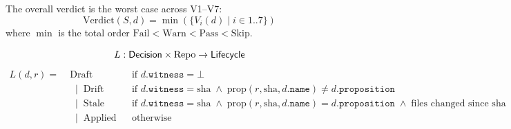 \begin{definition}
The overall verdict is the worst case across V1--V7:
$$\mathrm{Verdict}(S, d) = \min(\{V_i(d) \mid i \in 1..7\})$$
where $\min$ is the total order $\mathrm{Fail} < \mathrm{Warn} < \mathrm{Pass} < \mathrm{Skip}$.
\end{definition}

\begin{definition}
$$L : \mathsf{Decision} \times \mathrm{Repo} \to \mathsf{Lifecycle}$$
\begin{align*}
L(d, r) = \;& \mathrm{Draft}   &&\text{if } d.\mathtt{witness} = \bot \\
           &\;\mid\; \mathrm{Drift} &&\text{if } d.\mathtt{witness} = \text{sha} \;\wedge\; \mathrm{prop}(r, \text{sha}, d.\mathtt{name}) \neq d.\mathtt{proposition} \\
           &\;\mid\; \mathrm{Stale} &&\text{if } d.\mathtt{witness} = \text{sha} \;\wedge\; \mathrm{prop}(r, \text{sha}, d.\mathtt{name}) = d.\mathtt{proposition} \;\wedge\; \text{files changed since sha} \\
           &\;\mid\; \mathrm{Applied} &&\text{otherwise}
\end{align*}
\end{definition}